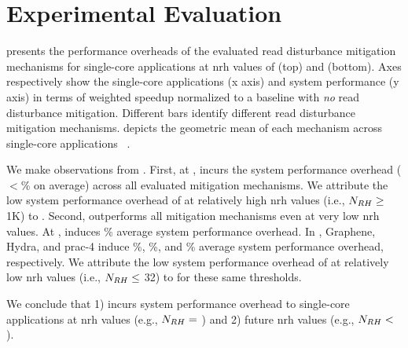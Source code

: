 \section{Experimental Evaluation}
\label{sec:evaluation}

 presents the performance overheads of the evaluated read disturbance mitigation mechanisms for  single-core applications at \gls{nrh} values of  (top) and  (bottom).
Axes respectively show the single-core applications (x axis) and system performance (y axis) in terms of weighted speedup normalized to a baseline with \emph{no} read disturbance mitigation.
Different bars identify different read disturbance mitigation mechanisms.
 depicts the geometric mean of each mechanism across  single-core applications ~\cite{altman2005standard}.

We make  observations from .
First, at , \X{} incurs the  system performance overhead ($<$\% on average) across all evaluated mitigation mechanisms.
We attribute the low system performance overhead of \X{} at relatively high \gls{nrh} values (i.e., $N_{RH}{} \geq$ 1K) to .
Second, \X{} outperforms all mitigation mechanisms even at very low \gls{nrh} values.
At , \X{} induces  \% average system performance overhead.
In , Graphene, Hydra, and \gls{prac}-4 induce \%, \%, and \% average system performance overhead, respectively.
We attribute the low system performance overhead of \X{} at relatively low \gls{nrh} values (i.e., $N_{RH}{} \leq$ 32) to  for these same thresholds.

We conclude that
1) \X{} incurs  system performance overhead to single-core applications at \gls{nrh} values  (e.g., $N_{RH}{} =$ ) and
2) \X{}  future \gls{nrh} values (e.g., $N_{RH}{} <$ ).

